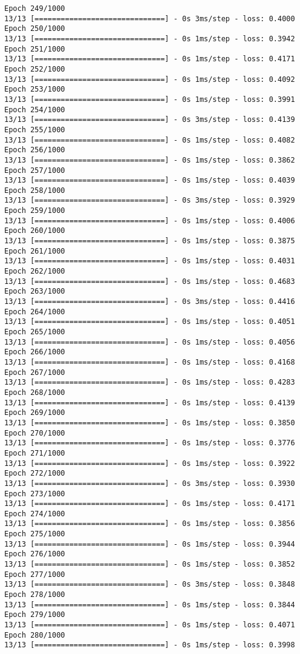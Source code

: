 \documentclass[11pt]{article}
\begin{document}
\begin{Verbatim}[commandchars=\\\{\}]
Epoch 249/1000
13/13 [==============================] - 0s 3ms/step - loss: 0.4000
Epoch 250/1000
13/13 [==============================] - 0s 1ms/step - loss: 0.3942
Epoch 251/1000
13/13 [==============================] - 0s 1ms/step - loss: 0.4171
Epoch 252/1000
13/13 [==============================] - 0s 1ms/step - loss: 0.4092
Epoch 253/1000
13/13 [==============================] - 0s 1ms/step - loss: 0.3991
Epoch 254/1000
13/13 [==============================] - 0s 3ms/step - loss: 0.4139
Epoch 255/1000
13/13 [==============================] - 0s 1ms/step - loss: 0.4082
Epoch 256/1000
13/13 [==============================] - 0s 1ms/step - loss: 0.3862
Epoch 257/1000
13/13 [==============================] - 0s 1ms/step - loss: 0.4039
Epoch 258/1000
13/13 [==============================] - 0s 3ms/step - loss: 0.3929
Epoch 259/1000
13/13 [==============================] - 0s 1ms/step - loss: 0.4006
Epoch 260/1000
13/13 [==============================] - 0s 1ms/step - loss: 0.3875
Epoch 261/1000
13/13 [==============================] - 0s 1ms/step - loss: 0.4031
Epoch 262/1000
13/13 [==============================] - 0s 1ms/step - loss: 0.4683
Epoch 263/1000
13/13 [==============================] - 0s 3ms/step - loss: 0.4416
Epoch 264/1000
13/13 [==============================] - 0s 1ms/step - loss: 0.4051
Epoch 265/1000
13/13 [==============================] - 0s 1ms/step - loss: 0.4056
Epoch 266/1000
13/13 [==============================] - 0s 1ms/step - loss: 0.4168
Epoch 267/1000
13/13 [==============================] - 0s 1ms/step - loss: 0.4283
Epoch 268/1000
13/13 [==============================] - 0s 1ms/step - loss: 0.4139
Epoch 269/1000
13/13 [==============================] - 0s 1ms/step - loss: 0.3850
Epoch 270/1000
13/13 [==============================] - 0s 1ms/step - loss: 0.3776
Epoch 271/1000
13/13 [==============================] - 0s 1ms/step - loss: 0.3922
Epoch 272/1000
13/13 [==============================] - 0s 3ms/step - loss: 0.3930
Epoch 273/1000
13/13 [==============================] - 0s 1ms/step - loss: 0.4171
Epoch 274/1000
13/13 [==============================] - 0s 1ms/step - loss: 0.3856
Epoch 275/1000
13/13 [==============================] - 0s 1ms/step - loss: 0.3944
Epoch 276/1000
13/13 [==============================] - 0s 1ms/step - loss: 0.3852
Epoch 277/1000
13/13 [==============================] - 0s 3ms/step - loss: 0.3848
Epoch 278/1000
13/13 [==============================] - 0s 1ms/step - loss: 0.3844
Epoch 279/1000
13/13 [==============================] - 0s 1ms/step - loss: 0.4071
Epoch 280/1000
13/13 [==============================] - 0s 1ms/step - loss: 0.3998

\end{Verbatim}
\end{document}
